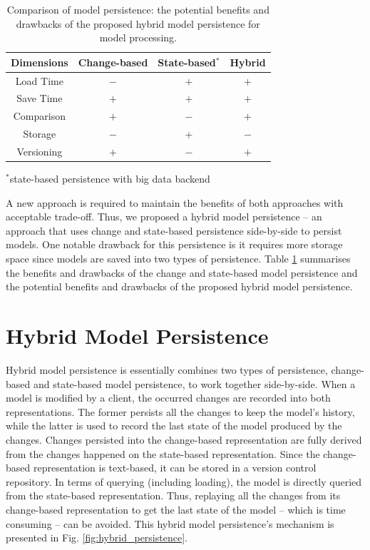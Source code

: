 \documentclass[10pt,conference]{IEEEtran}
\begin{document}
\begin{table} [ht]
    \centering
    \caption{Comparison of model persistence: the potential benefits and drawbacks of the proposed hybrid model persistence for model processing.}
    \label{table:persistence_comparsion}
    \begin{tabular}{ c c c c }
        \hline 
        \textbf{Dimensions} & \textbf{Change-based} & \textbf{State-based$^*$} & \textbf{Hybrid} \\
        \hline 
        Load Time & $-$ & $+$ & $+$  \\
        Save Time & $+$ & $+$ & $+$ \\
        Comparison & $+$ & $-$ & $+$ \\
        Storage & $-$ & $+$ & $-$ \\
        Versioning & $+$ & $-$ & $+$ \\
        \hline 
    \end{tabular}
    \flushright
    \tiny
    $^*$state-based persistence with big data backend
\end{table}

A new approach is required to maintain the benefits of both approaches with acceptable trade-off. Thus, we proposed a hybrid model persistence -- an approach that uses change and state-based persistence side-by-side to persist models. One notable drawback for this persistence is it requires more storage space since models are saved into two types of persistence. Table \ref{table:persistence_comparsion} summarises the benefits and drawbacks of the change and state-based model persistence and the potential benefits and drawbacks of the proposed hybrid model persistence.

\section{Hybrid Model Persistence}
\label{sec:hybrid_model_persistence}
Hybrid model persistence is essentially combines two types of persistence, change-based and state-based model persistence, to work together side-by-side. When a model is modified by a client, the occurred changes are recorded into both representations. The former persists all the changes to keep the model's history, while the latter is used to record the last state of the model produced by the changes. Changes persisted into the change-based representation are fully derived from the changes happened on the state-based representation. Since the change-based representation is text-based, it can be stored in a version control repository. In terms of querying (including loading), the model is directly queried from the state-based representation. Thus, replaying all the changes from its change-based representation to get the last state of the model -- which is time consuming -- can be avoided. This hybrid model persistence's mechanism is presented in Fig. \ref{fig:hybrid_persistence}.
\end{document}
